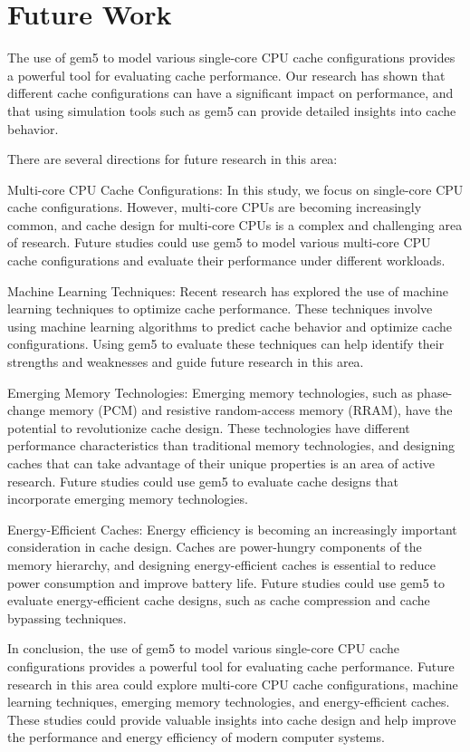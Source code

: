\documentclass[conference]{IEEEtran}
\begin{document}
\section{Future Work}
The use of gem5 to model various single-core CPU cache configurations provides a powerful tool for evaluating cache performance. Our research has shown that different cache configurations can have a significant impact on performance, and that using simulation tools such as gem5 can provide detailed insights into cache behavior.

There are several directions for future research in this area:

Multi-core CPU Cache Configurations: In this study, we focus on single-core CPU cache configurations. However, multi-core CPUs are becoming increasingly common, and cache design for multi-core CPUs is a complex and challenging area of research. Future studies could use gem5 to model various multi-core CPU cache configurations and evaluate their performance under different workloads.

Machine Learning Techniques: Recent research has explored the use of machine learning techniques to optimize cache performance. These techniques involve using machine learning algorithms to predict cache behavior and optimize cache configurations. Using gem5 to evaluate these techniques can help identify their strengths and weaknesses and guide future research in this area.

Emerging Memory Technologies: Emerging memory technologies, such as phase-change memory (PCM) and resistive random-access memory (RRAM), have the potential to revolutionize cache design. These technologies have different performance characteristics than traditional memory technologies, and designing caches that can take advantage of their unique properties is an area of active research. Future studies could use gem5 to evaluate cache designs that incorporate emerging memory technologies.

Energy-Efficient Caches: Energy efficiency is becoming an increasingly important consideration in cache design. Caches are power-hungry components of the memory hierarchy, and designing energy-efficient caches is essential to reduce power consumption and improve battery life. Future studies could use gem5 to evaluate energy-efficient cache designs, such as cache compression and cache bypassing techniques.

In conclusion, the use of gem5 to model various single-core CPU cache configurations provides a powerful tool for evaluating cache performance. Future research in this area could explore multi-core CPU cache configurations, machine learning techniques, emerging memory technologies, and energy-efficient caches. These studies could provide valuable insights into cache design and help improve the performance and energy efficiency of modern computer systems.
\end{document}
